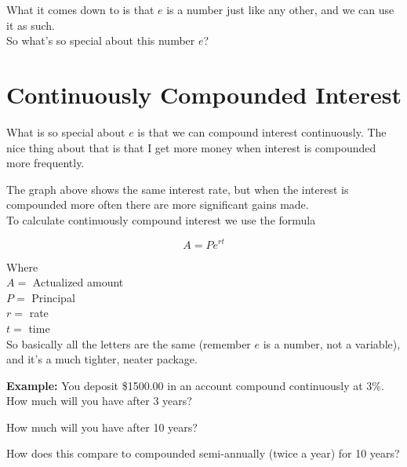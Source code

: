 \documentclass[12pt]{article}
\begin{document}
What it comes down to is that $e$ is a number just like any other, and we can use it as such.\\

So what's so special about this number $e$?

\pagebreak

\section*{Continuously Compounded Interest}

What is so special about $e$ is that we can compound interest continuously. The nice thing about that is that I get more money when interest is compounded more frequently.\\

\begin{center}
\end{center}

The graph above shows the same interest rate, but when the interest is compounded more often there are more significant gains made. \\

To calculate continuously compound interest we use the formula 

$$A=Pe^{rt}$$

Where\\
$A=$ Actualized amount\\
$P=$ Principal\\
$r=$ rate\\
$t=$ time\\

So basically all the letters are the same (remember $e$ is a number, not a variable), and it's a much tighter, neater package.\\

\pagebreak

\textbf{Example:} You deposit \$1500.00 in an account compound continuously at 3\%. How much will you have after 3 years?

\vspace{1in}

How much will you have after 10 years?\\

\vspace{1in}

How does this compare to compounded semi-annually (twice a year) for 10 years?\\
\end{document}
